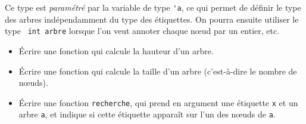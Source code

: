 \documentclass[11pt, a4paper]{article}
\begin{document}
\begin{enumerate}
       Ce type est \emph{paramétré} par la variable de type \verb+'a+,
       ce qui permet de définir le type des arbres indépendamment du
       type des étiquettes. On pourra ensuite utiliser le type {\tt
       int arbre} lorsque l'on veut annoter chaque nœud par un entier,
       etc.

       \begin{itemize}

         \item Écrire une fonction qui calcule la hauteur d'un arbre.

         \item Écrire une fonction qui calcule la taille d'un arbre
               (c'est-à-dire le nombre de nœuds).

         \item Écrire une fonction {\tt recherche}, qui prend en
               argument une étiquette {\tt x} et un arbre {\tt a}, et
               indique si cette étiquette apparaît sur l'un des nœuds
               de {\tt a}.
       \end{itemize}

\end{enumerate}
\end{document}
